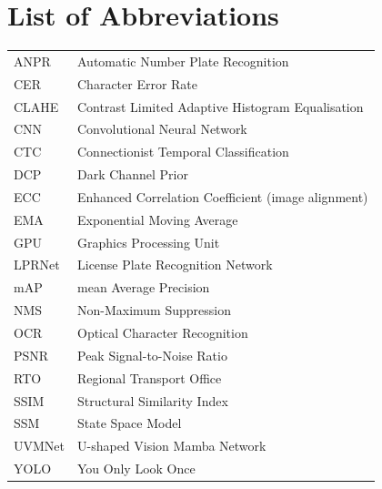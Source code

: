 \chapter*{List of Abbreviations}
\begin{tabular}{@{}p{3.2cm}p{11cm}@{}}
ANPR   & Automatic Number Plate Recognition\\
CER    & Character Error Rate\\
CLAHE  & Contrast Limited Adaptive Histogram Equalisation\\
CNN    & Convolutional Neural Network\\
CTC    & Connectionist Temporal Classification\\
DCP    & Dark Channel Prior\\
ECC    & Enhanced Correlation Coefficient (image alignment)\\
EMA    & Exponential Moving Average\\
GPU    & Graphics Processing Unit\\
LPRNet & License Plate Recognition Network\\
mAP    & mean Average Precision\\
NMS    & Non-Maximum Suppression\\
OCR    & Optical Character Recognition\\
PSNR   & Peak Signal-to-Noise Ratio\\
RTO    & Regional Transport Office\\
SSIM   & Structural Similarity Index\\
SSM    & State Space Model\\
UVMNet & U-shaped Vision Mamba Network\\
YOLO   & You Only Look Once\\
\end{tabular}
\clearpage
